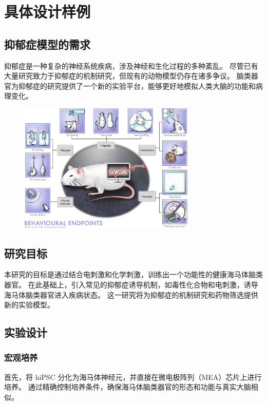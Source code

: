\chapter{具体设计样例}\label{chap:design}

\section{抑郁症模型的需求}\label{sec:depression-model-requirement}
抑郁症是一种复杂的神经系统疾病，涉及神经和生化过程的多种紊乱。
尽管已有大量研究致力于抑郁症的机制研究，但现有的动物模型仍存在诸多争议。
脑类器官为抑郁症的研究提供了一个新的实验平台，能够更好地模拟人类大脑的功能和病理变化。

\begin{figure}[!htbp]
    \centering
    \includegraphics[width=0.75\textwidth]{Img/depression-model.png}
    \label{fig:depression-model}
\end{figure}

\section{研究目标}\label{sec:research-objective}
本研究的目标是通过结合电刺激和化学刺激，训练出一个功能性的健康海马体脑类器官。
在此基础上，引入常见的抑郁症诱导机制，如毒性化合物和电刺激，诱导海马体脑类器官进入疾病状态。
这一研究将为抑郁症的机制研究和药物筛选提供新的实验模型。


\section{实验设计}\label{sec:experiment-design}
\subsection{宏观培养}\label{subsec:macro-culture}
首先，将 hiPSC 分化为海马体神经元，并直接在微电极阵列（MEA）芯片上进行培养。
通过精确控制培养条件，确保海马体脑类器官的形态和功能与真实大脑相似。

